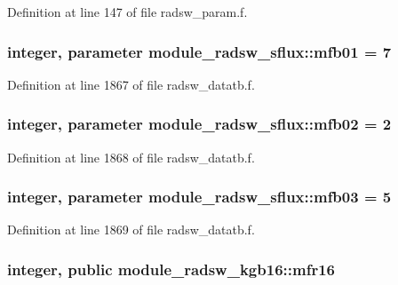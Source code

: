 Definition at line 147 of file radsw\+\_\+param.\+f.

\subsubsection[{\texorpdfstring{mfb01}{mfb01}}]{\setlength{\rightskip}{0pt plus 5cm}integer, parameter module\+\_\+radsw\+\_\+sflux\+::mfb01 = 7}\hypertarget{group__module__radsw__main_ga08a0f1278962ac27634169ea7632bc70}{}\label{group__module__radsw__main_ga08a0f1278962ac27634169ea7632bc70}


Definition at line 1867 of file radsw\+\_\+datatb.\+f.

\subsubsection[{\texorpdfstring{mfb02}{mfb02}}]{\setlength{\rightskip}{0pt plus 5cm}integer, parameter module\+\_\+radsw\+\_\+sflux\+::mfb02 = 2}\hypertarget{group__module__radsw__main_gafdf71cabed6ae0076d98ff0e563dbc61}{}\label{group__module__radsw__main_gafdf71cabed6ae0076d98ff0e563dbc61}


Definition at line 1868 of file radsw\+\_\+datatb.\+f.

\subsubsection[{\texorpdfstring{mfb03}{mfb03}}]{\setlength{\rightskip}{0pt plus 5cm}integer, parameter module\+\_\+radsw\+\_\+sflux\+::mfb03 = 5}\hypertarget{group__module__radsw__main_ga2e3b510d781c596fa0bb9b1359a988dd}{}\label{group__module__radsw__main_ga2e3b510d781c596fa0bb9b1359a988dd}


Definition at line 1869 of file radsw\+\_\+datatb.\+f.

\subsubsection[{\texorpdfstring{mfr16}{mfr16}}]{\setlength{\rightskip}{0pt plus 5cm}integer, public module\+\_\+radsw\+\_\+kgb16\+::mfr16}\hypertarget{group__module__radsw__main_gaeee3fe8e44f6fbd9a6a008bc9f97f37c}{}\label{group__module__radsw__main_gaeee3fe8e44f6fbd9a6a008bc9f97f37c}


